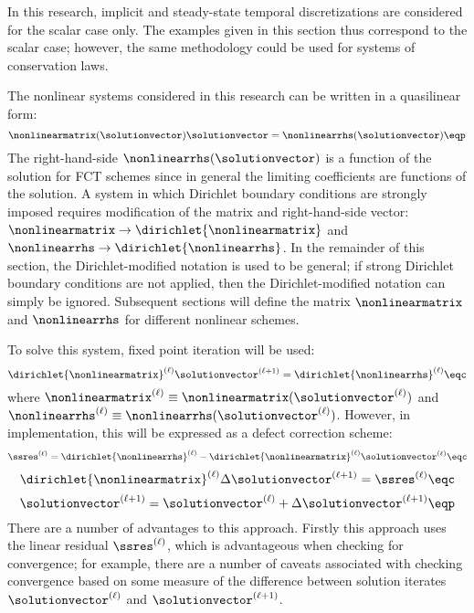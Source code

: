 In this research, implicit and steady-state temporal discretizations are
considered for the scalar case only. The examples given in this section thus
correspond to the scalar case; however, the same methodology could be used
for systems of conservation laws.

The nonlinear systems considered in this research can be written in a quasilinear
form:
\begin{equation}\label{eq:nonlinear_equation}
  \nonlinearmatrix(\solutionvector)\solutionvector
    = \nonlinearrhs(\solutionvector) \eqp
\end{equation}
The right-hand-side $\nonlinearrhs(\solutionvector)$ is a function of
the solution for FCT schemes since in general the limiting coefficients are
functions of the solution.
A system in which Dirichlet boundary conditions are strongly imposed
requires modification of the matrix and right-hand-side vector:
$\nonlinearmatrix\rightarrow\dirichlet{\nonlinearmatrix}$ and
$\nonlinearrhs\rightarrow\dirichlet{\nonlinearrhs}$. In the remainder of
this section, the Dirichlet-modified notation is used to be general;
if strong Dirichlet boundary conditions are not applied, then the
Dirichlet-modified notation can simply be ignored. Subsequent sections
will define the matrix $\nonlinearmatrix$ and $\nonlinearrhs$ for different
nonlinear schemes.

To solve this system, fixed point iteration will be used:
\begin{equation}
  \dirichlet{\nonlinearmatrix}^{(\ell)}\solutionvector^{(\ell+1)}
    = \dirichlet{\nonlinearrhs}^{(\ell)} \eqc
\end{equation}
where $\nonlinearmatrix^{(\ell)}\equiv\nonlinearmatrix(\solutionvector^{(\ell)})$
and $\nonlinearrhs^{(\ell)}\equiv\nonlinearrhs(\solutionvector^{(\ell)})$.
However, in implementation, this will be expressed as a defect correction scheme:
\begin{equation}
  \ssres^{(\ell)} = \dirichlet{\nonlinearrhs}^{(\ell)}
    - \dirichlet{\nonlinearmatrix}^{(\ell)}\solutionvector^{(\ell)} \eqc
\end{equation}
\begin{equation}
  \dirichlet{\nonlinearmatrix}^{(\ell)}\Delta\solutionvector^{(\ell+1)}
    = \ssres^{(\ell)} \eqc
\end{equation}
\begin{equation}
  \solutionvector^{(\ell+1)} = \solutionvector^{(\ell)}
    + \Delta\solutionvector^{(\ell+1)} \eqp
\end{equation}
There are a number of advantages to this approach. Firstly this approach uses
the linear residual $\ssres^{(\ell)}$, which is advantageous when checking
for convergence; for example, there are a number of caveats associated with
checking convergence based on some measure of the difference between solution
iterates $\solutionvector^{(\ell)}$ and $\solutionvector^{(\ell+1)}$.

